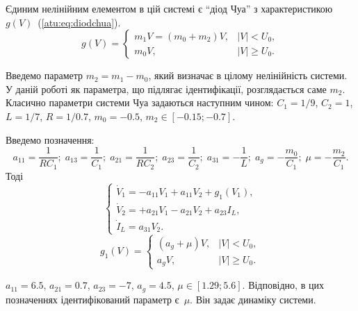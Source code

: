 \documentclass[a4paper,13pt]{atuaref}
\begin{document}
Єдиним нелінійним елементом в цій системі є ``діод Чуа'' з характеристикою
$g(V)$~(\ref{atu:eq:diodchua}).
%
%
\begin{equation}
g(V) =
\begin{cases}
  m_1 V = ( m_0 + m_2 ) V , & |V| <   U_0, \\
  m_0 V ,                   & |V| \ge U_0.
\end{cases}
\label{atu:eq:diodchua}
\end{equation}

Введемо параметр \(m_2 = m_1 - m_0 \), який визначає в цілому нелінійність
системи. У даній роботі як параметра, що підлягає ідентифікації, розглядається саме
\(m_2 \).
Класично параметри системи Чуа задаються наступним чином:
$C_1 = 1/9$, $C_2 = 1$, $L= 1/7$, $R = 1/0.7$, $m_0=-0.5$, $ m_2 \in [ -0.15; -0.7 ] $.

Введемо позначення:
\[
  a_{11} = \frac{1}{R C_1}; \;
  a_{13} = \frac{1}{C_1}; \;
  a_{21} = \frac{1}{R C_2}; \;
  a_{23} = \frac{1}{C_2}; \;
  a_{31} = -\frac{1}{L}; \;
  a_g = - \frac{m_0}{C_1}; \;
  \mu = - \frac{m_2}{C_1}.
\]
%
Тоді
%
\begin{equation}
\begin{cases}
  \dot{V}_1  = -a_{11} V_1 + a_{11}  V_2  + g_1(V_1) , \\
  \dot{V}_2  = +a_{21} V_1 - a_{21}  V_2  + a_{23} I_L    , \\
  \dot{I}_L  =  a_{31} V_2.
\end{cases}
\label{atu:eq:chua2}
\end{equation}
%
%
\begin{equation}
g_1(V) =
\begin{cases}
  ( a_g + \mu ) V , & |V| <   U_0, \\
  a_g V           , & |V| \ge U_0.
\end{cases}
\label{atu:eq:diodchua2}
\end{equation}

\noindent
$ a_{11} = 6.5 $, $a_{21} = 0.7$, $ a_{23} = -7 $, $ a_g = 4.5 $,
$ \mu \in [ 1.29 ; 5.6 ] $.
Відповідно, в цих позначеннях ідентифікований параметр є~$\mu$.
Він задає динаміку системи.
%
\end{document}
